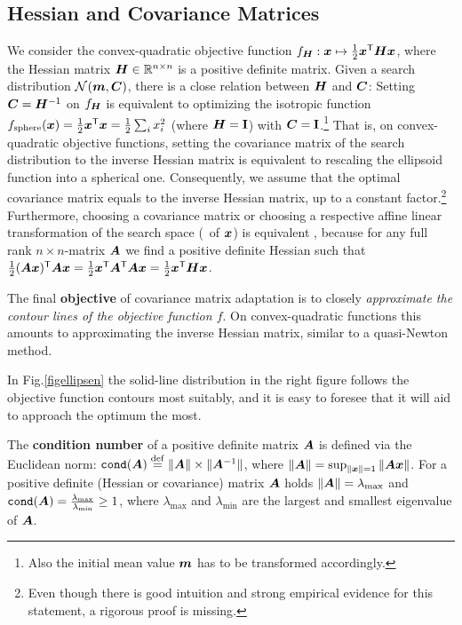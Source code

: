 \documentclass{article} %
\newcommand{\R}{\mathbb{R}}
\newcommand{\ve}[1]{\mathchoice{\mbox{\boldmath$\displaystyle#1$}}
  {\mbox{\boldmath$\textstyle#1$}} {\mbox{\boldmath$\scriptstyle#1$}}
  {\mbox{\boldmath$\scriptscriptstyle#1$}}}
\newcommand{\ma}[1]{\mathchoice{\mbox{\boldmath$\displaystyle#1$}}
  {\mbox{\boldmath$\textstyle#1$}} {\mbox{\boldmath$\scriptstyle#1$}}
  {\mbox{\boldmath$\scriptscriptstyle#1$}}}
\newcommand{\T}{\ensuremath{\mathsf{T}}}
\newcommand{\mal}{\cdot}
\newcommand{\auge}[1]{\textbf{#1}}
\newcommand{\fsphere}{f_{\mathrm{sphere}}}
\newcommand{\N}{\ensuremath{n}}
\newcommand{\Normal}[1]{{\mathcal N}\hspace{-0.13em}\left(#1\right)}
\newcommand{\Id}{\mathbf{I}}
\renewcommand{\mal}{\times}
\newcommand{\pref}[1]{\mbox{.\hspace{0.235em}\ref{#1}}}
\begin{document}
\subsection{Hessian and Covariance Matrices}
We consider the convex-quadratic objective function
$f_{\ma{H}}:\ve{x}\mapsto \frac{1}{2}\ve{x}^\T\ma{H}\ve{x}$, where the
Hessian matrix $\ma{H}\in\R^{\N\times\N}$ is a positive definite
matrix. Given a search distribution $\Normal{\ve{m},\ma{C}}$, there is
a close relation between $\ma{H}$ and $\ma{C}$: Setting
$\ma{C}=\ma{H}^{-1}$ on $f_{\ma{H}}$ is equivalent to optimizing the
isotropic function
$\fsphere(\ve{x})=\frac{1}{2}\ve{x}^\T\ve{x}=\frac{1}{2}\sum_i x_i^2$
(where $\ma{H}=\Id$) with
$\ma{C}=\Id$.\footnote{%
  Also the initial mean value $\ve{m}$ has to be transformed
  accordingly. }
%
That is, on convex-quadratic objective functions, setting the
covariance matrix of the search distribution to the inverse Hessian
matrix is equivalent to rescaling the ellipsoid function into a
spherical one.  Consequently, we assume that the optimal covariance
matrix equals to the inverse Hessian matrix, up to a constant 
factor.\footnote{%
%
  Even though there is good intuition and strong empirical evidence
  for this statement, a rigorous proof is missing. }
%
Furthermore, choosing a covariance matrix or choosing a respective
affine linear transformation of the search space (\ie\ of $\ve{x}$)
is equivalent \cite{Hansen:2000}, because for any full rank
$\N\times\N$-matrix $\ma{A}$ we find a positive definite Hessian such
that $\frac{1}{2}(\ma{A}\ve{x})^\T \ma{A}\ve{x} = \frac{1}{2}\ve{x}^\T
\ma{A}^\T \ma{A}\ve{x} = \frac{1}{2}\ve{x}^\T\ma{H}\ve{x}$.

The final \auge{objective} of covariance matrix adaptation is
to closely \emph{approximate the contour lines of the objective function $f$}. On convex-quadratic functions this amounts to approximating the inverse Hessian matrix, similar to a quasi-Newton method. 

In
Fig\pref{figellipsen} the solid-line distribution in the right figure
follows the objective function contours most suitably, and it is easy
to foresee that it will aid to approach the optimum the most.

The \label{def:condition}\auge{condition number} of a positive
definite matrix $\ma{A}$ is defined via the Euclidean norm:
$\mathtt{cond}(\ma{A})\stackrel{\mathrm{def}}{=}\|\ma{A}\|\mal\|\ma{A}^{-1}\|$,
where $\|\ma{A}\|=\sup_{\|\ve{x}\|=1}{{\|\ma{A}\ve{x}\|}{}}$. For a
positive definite (Hessian or covariance) matrix $\ma{A}$ holds
$\|\ma{A}\|=\lambda_\mathrm{max}$ and $\mathtt{cond}(\ma{A}) =
\frac{\lambda_\mathrm{max}}{\lambda_\mathrm{min}}\ge1$, where
$\lambda_\mathrm{max}$ and $\lambda_\mathrm{min}$ are the largest and
smallest eigenvalue of $\ma{A}$.
%
\end{document}
